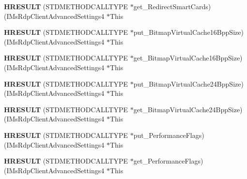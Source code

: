 \begin{DoxyCompactItemize}
{\bfseries H\+R\+E\+S\+U\+LT} (S\+T\+D\+M\+E\+T\+H\+O\+D\+C\+A\+L\+L\+T\+Y\+PE $\ast$get\+\_\+\+Redirect\+Smart\+Cards)(I\+Ms\+Rdp\+Client\+Advanced\+Settings4 $\ast$This
\item 
\mbox{\label{struct_i_ms_rdp_client_advanced_settings4_vtbl_ade9db091a2d8d8b583019d99721f9429}} 
{\bfseries H\+R\+E\+S\+U\+LT} (S\+T\+D\+M\+E\+T\+H\+O\+D\+C\+A\+L\+L\+T\+Y\+PE $\ast$put\+\_\+\+Bitmap\+Virtual\+Cache16\+Bpp\+Size)(I\+Ms\+Rdp\+Client\+Advanced\+Settings4 $\ast$This
\item 
\mbox{\label{struct_i_ms_rdp_client_advanced_settings4_vtbl_a248de40f77828d96f6df00f020040313}} 
{\bfseries H\+R\+E\+S\+U\+LT} (S\+T\+D\+M\+E\+T\+H\+O\+D\+C\+A\+L\+L\+T\+Y\+PE $\ast$get\+\_\+\+Bitmap\+Virtual\+Cache16\+Bpp\+Size)(I\+Ms\+Rdp\+Client\+Advanced\+Settings4 $\ast$This
\item 
\mbox{\label{struct_i_ms_rdp_client_advanced_settings4_vtbl_af2b827f8f98aefa5a0336550778a308c}} 
{\bfseries H\+R\+E\+S\+U\+LT} (S\+T\+D\+M\+E\+T\+H\+O\+D\+C\+A\+L\+L\+T\+Y\+PE $\ast$put\+\_\+\+Bitmap\+Virtual\+Cache24\+Bpp\+Size)(I\+Ms\+Rdp\+Client\+Advanced\+Settings4 $\ast$This
\item 
\mbox{\label{struct_i_ms_rdp_client_advanced_settings4_vtbl_a92e1584f3e52360b4a25576e5f82e37e}} 
{\bfseries H\+R\+E\+S\+U\+LT} (S\+T\+D\+M\+E\+T\+H\+O\+D\+C\+A\+L\+L\+T\+Y\+PE $\ast$get\+\_\+\+Bitmap\+Virtual\+Cache24\+Bpp\+Size)(I\+Ms\+Rdp\+Client\+Advanced\+Settings4 $\ast$This
\item 
\mbox{\label{struct_i_ms_rdp_client_advanced_settings4_vtbl_afe7149ea94a8261abd57088e9038222c}} 
{\bfseries H\+R\+E\+S\+U\+LT} (S\+T\+D\+M\+E\+T\+H\+O\+D\+C\+A\+L\+L\+T\+Y\+PE $\ast$put\+\_\+\+Performance\+Flags)(I\+Ms\+Rdp\+Client\+Advanced\+Settings4 $\ast$This
\item 
\mbox{\label{struct_i_ms_rdp_client_advanced_settings4_vtbl_a61c6f1840855ebda193d6731c0d7f326}} 
{\bfseries H\+R\+E\+S\+U\+LT} (S\+T\+D\+M\+E\+T\+H\+O\+D\+C\+A\+L\+L\+T\+Y\+PE $\ast$get\+\_\+\+Performance\+Flags)(I\+Ms\+Rdp\+Client\+Advanced\+Settings4 $\ast$This

\end{DoxyCompactItemize}
